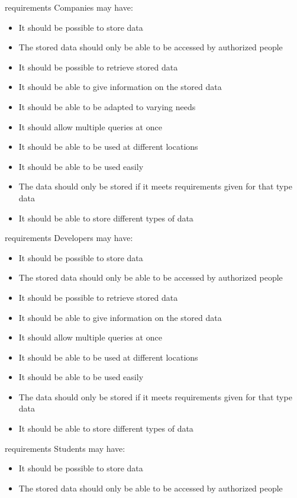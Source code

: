 \begin{elenco}
	

\item 
requirements Companies may have:
\begin{itemize}
    \item It should be possible to store data
    \item The stored data should only be able to be accessed by authorized people
    \item It should be possible to retrieve stored data
    \item It should be able to give information on the stored data
    \item It should be able to be adapted to varying needs
    \item It should allow multiple queries at once
    \item It should be able to be used at different locations
    \item It should be able to be used easily
    \item The data should only be stored if it meets requirements given for that type data
    \item It should be able to store different types of data
\end{itemize} 
requirements Developers may have:
\begin{itemize}
    \item It should be possible to store data
    \item The stored data should only be able to be accessed by authorized people
    \item It should be possible to retrieve stored data
    \item It should be able to give information on the stored data
    \item It should allow multiple queries at once
    \item It should be able to be used at different locations
    \item It should be able to be used easily
    \item The data should only be stored if it meets requirements given for that type data
    \item It should be able to store different types of data
\end{itemize}
requirements Students may have:
\begin{itemize}
    \item It should be possible to store data
    \item The stored data should only be able to be accessed by authorized people

\end{itemize}
\end{elenco}
